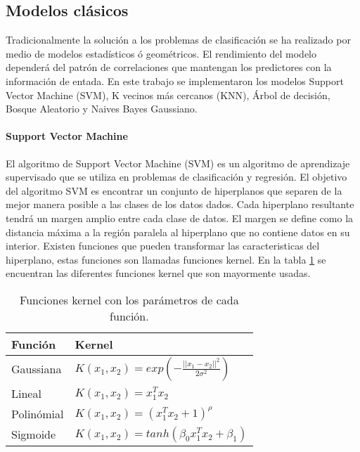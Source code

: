 \subsection{Modelos clásicos}

Tradicionalmente la solución a los problemas de clasificación se ha realizado por medio de modelos estadísticos ó geométricos. El rendimiento del modelo dependerá del patrón de correlaciones que mantengan los predictores con la información de entada. En este trabajo se implementaron los modelos Support Vector Machine (SVM), K vecinos más cercanos (KNN), Árbol de decisión, Bosque Aleatorio y Naives Bayes Gaussiano.

\paragraph{Support Vector Machine}

El algoritmo de Support Vector Machine (SVM) es un algoritmo de aprendizaje supervisado que se utiliza en problemas de clasificación y regresión. El objetivo del algoritmo SVM es encontrar un conjunto de hiperplanos que separen de la mejor manera posible a las clases de los datos dados. Cada hiperplano resultante tendrá un margen amplio entre cada clase de datos. El margen se define como la distancia máxima a la región paralela al hiperplano que no contiene datos en su interior. Existen funciones que pueden transformar las caracteristicas del hiperplano, estas funciones son llamadas funciones kernel. En la tabla \ref{table:kernels} se encuentran las diferentes funciones kernel que son mayormente usadas.

\begin{table}[H]
	\centering
	\begin{tabular}{ll} \hline
		\textbf{Función} & \textbf{Kernel}                                                  \\ \hline
		Gaussiana        & $K(x_1,x_2) = exp\left(-\frac{||x_1-x_2||^2}{2\sigma^2} \right)$ \\[0.1cm]
		Lineal           & $K(x_1,x_2)=x_1^Tx_2$                                            \\[0.1cm]
		Polinómial       & $K(x_1,x_2)= (x_1^Tx_2+1)^\rho $                                 \\[0.1cm]
		Sigmoide         & $K(x_1,x_2)=tanh(\beta_0 x_1^Tx_2+\beta_1)$                      \\ [0.1cm]\hline
	\end{tabular}
	\caption{Funciones kernel con los parámetros de cada función.}
	\label{table:kernels}
\end{table}

